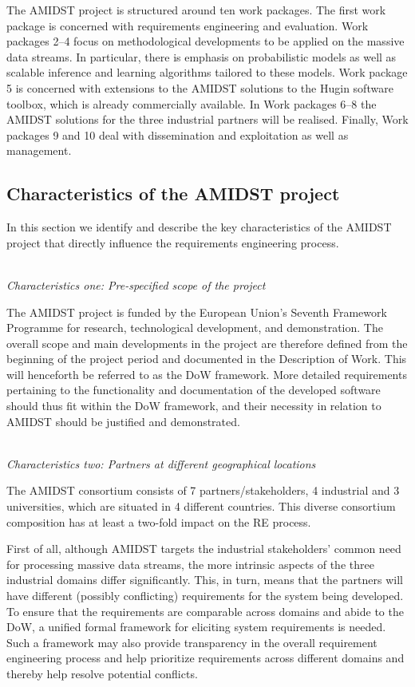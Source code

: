 The AMIDST project is structured around ten work packages. The first work package is concerned with requirements
engineering and evaluation. Work packages 2--4 focus on methodological developments to be applied on the massive data streams.  In particular, there is emphasis on probabilistic models as well as scalable inference and learning
algorithms tailored to these models. Work package 5 is concerned with extensions to the AMIDST solutions to the Hugin software toolbox, which is already commercially available.  In Work packages 6--8 the AMIDST solutions for the three industrial partners will be realised. Finally, Work packages 9 and 10 deal with dissemination and exploitation as well as management.     

\subsection{Characteristics of the AMIDST project}
\label{sec:characteristics}

In this section we identify and describe the key characteristics of the AMIDST project that directly influence the 
requirements
engineering process. 

\ \\
\noindent \emph{Characteristics one:  Pre-specified scope of the project}
\label{sec:characteristic1}

The AMIDST project is funded by the European Union's Seventh Framework Programme for research, technological
development, and demonstration. The overall scope and main developments in the project are therefore defined from the
beginning of the project period and documented in the Description of Work. This will henceforth be referred to
as the DoW framework. More detailed requirements pertaining
to the functionality and documentation of the developed software should thus fit within the DoW framework, and their
necessity in relation to AMIDST should be justified and demonstrated.   


 

\ \\
\noindent \emph{Characteristics two: Partners at different geographical locations}
\label{sec:characteristic2}

The AMIDST consortium consists of 7 partners/stakeholders, 4 industrial and 3 universities, which are situated in 4 different
countries. This diverse consortium composition has at least a two-fold impact on the RE process.

First of
all, although AMIDST targets the industrial stakeholders' common need for processing massive data streams, the more
intrinsic aspects of the three industrial domains differ significantly. This, in turn, means that the partners will have different
(possibly conflicting) requirements for the system being developed. To ensure that the requirements are comparable
across domains and abide to the DoW, a unified formal framework for eliciting system requirements is needed. Such a
framework may also provide transparency in the overall requirement engineering process and help prioritize requirements
across different domains and thereby help resolve potential conflicts.   

